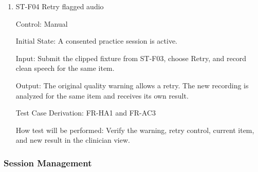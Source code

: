 \documentclass[12pt, titlepage]{article}
\begin{document}
\begin{enumerate}
Output: The clean clip is not flagged for quality. Each failing recording is flagged to the SLP, who can retry.

Test Case Derivation: FR-AC3 and FR-HA1

How test will be performed: Generate variants from the same clean clip, log the thresholds and measured values, and compare the quality status for each run.

\item{ST-F04 Retry flagged audio\\}

Control: Manual

Initial State: A consented practice session is active.

Input: Submit the clipped fixture from ST-F03, choose Retry, and record clean speech for the same item.

Output: The original quality warning allows a retry. The new recording is analyzed for the same item and receives its own result.

Test Case Derivation: FR-HA1 and FR-AC3

How test will be performed: Verify the warning, retry control, current item, and new result in the clinician view.

\end{enumerate}

\subsubsection{Session Management}
\end{document}
